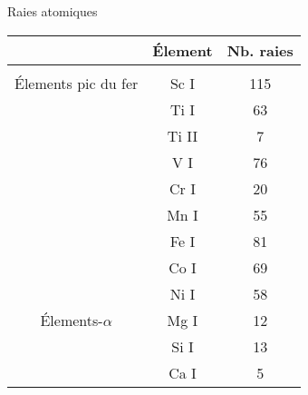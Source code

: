 \documentclass[10pt]{beamer}
\begin{document}
\begin{frame}[fragile]{Raies atomiques}

\begin{table}[h!]
    \begin{center}
        \begin{tabular}{c|c|c}
            & Élement & Nb. raies\\
            \hline
            &&\\
            Élements pic du fer & Sc I &115\\
             & Ti I&63\\
             & Ti II&7\\
             & V I&76\\
             & Cr I&20\\
             & Mn I&55\\
             &Fe I&81 \\
            & Co I&69\\
            & Ni I&58\\
            Élements-$\alpha$ & Mg I&12 \\
             & Si I&13 \\
             & Ca I& 5\\
        \end{tabular}
    \end{center}
\end{table}


\end{frame}
\end{document}

